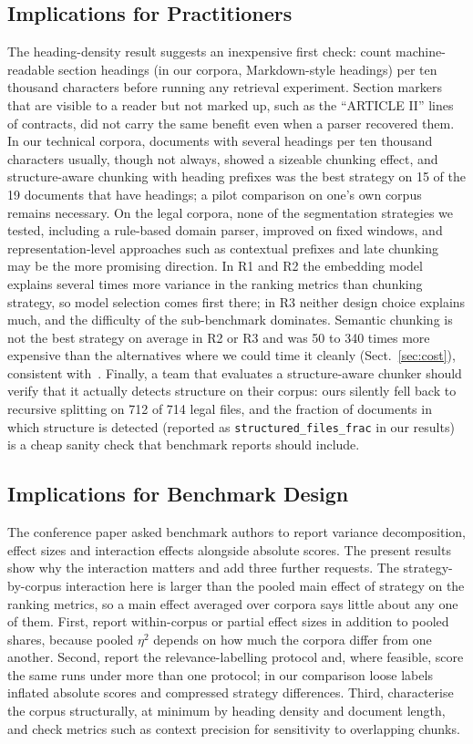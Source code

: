 \documentclass[runningheads]{llncs}
\begin{document}
\subsection{Implications for Practitioners}
The heading-density result suggests an inexpensive first check: count machine-readable section headings (in our corpora, Markdown-style headings) per ten thousand characters before running any retrieval experiment. Section markers that are visible to a reader but not marked up, such as the ``ARTICLE II'' lines of contracts, did not carry the same benefit even when a parser recovered them. In our technical corpora, documents with several headings per ten thousand characters usually, though not always, showed a sizeable chunking effect, and structure-aware chunking with heading prefixes was the best strategy on 15 of the 19 documents that have headings; a pilot comparison on one's own corpus remains necessary. On the legal corpora, none of the segmentation strategies we tested, including a rule-based domain parser, improved on fixed windows, and representation-level approaches such as contextual prefixes and late chunking~\cite{anthropic2024contextual,gunther2024latechunking,conti2025conteb} may be the more promising direction. In R1 and R2 the embedding model explains several times more variance in the ranking metrics than chunking strategy, so model selection comes first there; in R3 neither design choice explains much, and the difficulty of the sub-benchmark dominates. Semantic chunking is not the best strategy on average in R2 or R3 and was 50 to 340 times more expensive than the alternatives where we could time it cleanly (Sect.~\ref{sec:cost}), consistent with~\cite{qu2025semantic}. Finally, a team that evaluates a structure-aware chunker should verify that it actually detects structure on their corpus: ours silently fell back to recursive splitting on 712 of 714 legal files, and the fraction of documents in which structure is detected (reported as \texttt{structured\_files\_frac} in our results) is a cheap sanity check that benchmark reports should include.

\subsection{Implications for Benchmark Design}
The conference paper asked benchmark authors to report variance decomposition, effect sizes and interaction effects alongside absolute scores. The present results show why the interaction matters and add three further requests. The strategy-by-corpus interaction here is larger than the pooled main effect of strategy on the ranking metrics, so a main effect averaged over corpora says little about any one of them. First, report within-corpus or partial effect sizes in addition to pooled shares, because pooled $\eta^2$ depends on how much the corpora differ from one another. Second, report the relevance-labelling protocol and, where feasible, score the same runs under more than one protocol; in our comparison loose labels inflated absolute scores and compressed strategy differences. Third, characterise the corpus structurally, at minimum by heading density and document length, and check metrics such as context precision for sensitivity to overlapping chunks.
\end{document}
